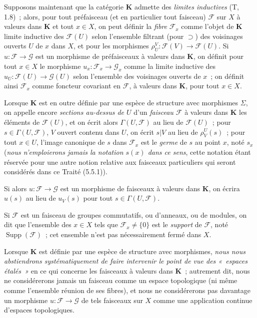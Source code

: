 \begin{env}[3.1.6]
\label{0.3.1.6-fr}
Supposons maintenant que la catégorie $\boldsymbol{K}$ admette des \emph{limites
inductives} (T, 1.8)~; alors, pour tout préfaisceau (et en particulier tout
faisceau) $\mathcal{F}$ sur $X$ à valeurs dans $\boldsymbol{K}$ et tout $x\in X$,
on peut définir la \emph{fibre} $\mathcal{F}_x$ comme l'objet de $\boldsymbol{K}$
limite inductive des $\mathcal{F}(U)$ selon l'ensemble filtrant (pour
$\supset$) des voisinages ouverts $U$ de $x$ dans $X$, et pour les morphismes
$\rho_U^V:\mathcal{F}(V)\to\mathcal{F}(U)$. Si
$u:\mathcal{F}\to\mathcal{G}$ est un morphisme de préfaisceaux à valeurs dans
$\boldsymbol{K}$, on définit pour tout $x\in X$ le morphisme
$u_x:\mathcal{F}_x\to\mathcal{G}_x$ comme la limite inductive des
$u_U:\mathcal{F}(U)\to\mathcal{G}(U)$ selon l'ensemble des voisinages ouverts
de $x$~; on définit ainsi $\mathcal{F}_x$ comme foncteur covariant en
$\mathcal{F}$, à valeurs dans $\boldsymbol{K}$, pour tout $x\in X$.

Lorsque $\boldsymbol{K}$ est en outre définie par une espèce de structure avec
morphismes $\Sigma$, on appelle encore \emph{sections au-dessus de $U$} d'un
\emph{faisceau $\mathcal{F}$} à valeurs dans $\boldsymbol{K}$ les éléments de
$\mathcal{F}(U)$, et on écrit alors $\Gamma(U,\mathcal{F})$ au lieu de
$\mathcal{F}(U)$~; pour $s\in\Gamma(U,\mathcal{F})$, $V$ ouvert contenu dans
$U$, on écrit $s|V$ au lieu de $\rho_V^U(s)$~; pour tout $x\in U$, l'image
canonique de $s$ dans $\mathcal{F}_x$ est le \emph{germe} de $s$ au point $x$,
noté $s_x$ (\emph{nous n'emploierons jamais la notation $s(x)$ dans ce sens},
cette notation étant réservée pour une autre notion relative aux faisceaux
particuliers qui seront considérés dans ce Traité (5.5.1)).

Si alors $u:\mathcal{F}\to\mathcal{G}$ est un morphisme de faisceaux à valeurs
dans $\boldsymbol{K}$, on écrira $u(s)$ au lieu de $u_V(s)$ pour tout
$s\in\Gamma(U,\mathcal{F})$.

Si $\mathcal{F}$ est un faisceau de groupes commutatifs, ou d'anneaux, ou de
modules, on dit que l'ensemble des $x\in X$ tels que
$\mathcal{F}_x\neq\{0\}$ est le \emph{support} de $\mathcal{F}$, noté
$\operatorname{Supp}(\mathcal{F})$~; cet ensemble n'est pas nécessairement
fermé dans $X$.

Lorsque $\boldsymbol{K}$ est définie par une espèce de structure avec morphismes,
\emph{nous nous abstiendrons systématiquement de faire intervenir le point de
vue des «~espaces étalés~»} en ce qui concerne les faisceaux à valeurs dans
$\boldsymbol{K}$~; autrement dit, nous ne considérerons jamais un faisceau comme
un espace topologique (ni même comme l'ensemble réunion de ses fibres), et
nous ne considérerons pas davantage un morphisme
$u:\mathcal{F}\to\mathcal{G}$ de tels faisceaux sur $X$ comme une application
continue d'espaces topologiques.
\end{env}

